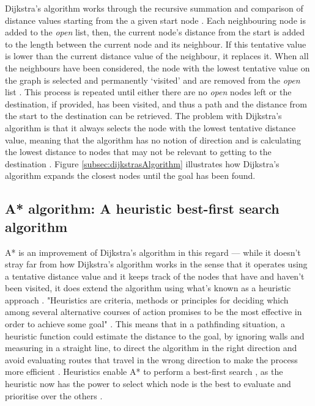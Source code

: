 \documentclass[11pt, a4paper]{report}
\begin{document}
Dijkstra's algorithm works through the recursive summation and comparison of distance values starting from the a given start node \parencite[269]{dijkstra1959note}. Each neighbouring node is added to the \emph{open} list, then, the current node's distance from the start is added to the length between the current node and its neighbour. If this tentative value is lower than the current distance value of the neighbour, it replaces it. When all the neighbours have been considered, the node with the lowest tentative value on the graph is selected and permanently `visited' and are removed from the \emph{open} list \parencite{dijkstra1959note}. This process is repeated until either there are no \emph{open} nodes left or the destination, if provided, has been visited, and thus a path and the distance from the start to the destination can be retrieved. The problem with Dijkstra's algorithm is that it always selects the node with the lowest tentative distance value, meaning that the algorithm has no notion of direction and is calculating the lowest distance to nodes that may not be relevant to getting to the destination \parencite[214]{millington2019ai}. Figure \ref{subsec:dijkstrasAlgorithm} illustrates how Dijkstra's algorithm expands the closest nodes until the goal has been found.

\subsection{A* algorithm: A heuristic best-first search algorithm}
\label{subsec:aStarAlgorithm}

A* is an improvement of Dijkstra's algorithm in this regard \parencite[101]{hart1968formal} --- while it doesn't stray far from how Dijkstra's algorithm works in the sense that it operates using a tentative distance value and it keeps track of the nodes that have and haven't been visited, it does extend the algorithm using what's known as a heuristic approach \parencite[126]{cui2011based}. "Heuristics are criteria, methods or principles for deciding which among several alternative courses of action promises to be the most effective in order to achieve some goal" \parencite[3]{pearl1984heuristics}. This means that in a pathfinding situation, a heuristic function could estimate the distance to the goal, by ignoring walls and measuring in a straight line, to direct the algorithm in the right direction and avoid evaluating routes that travel in the wrong direction to make the process more efficient \parencite[127]{cui2011based}. Heuristics enable A* to perform a best-first search \parencite[46]{yap2002grid}, as the heuristic now has the power to select which node is the best to evaluate and prioritise over the others \parencite[94]{russell2016artificial}.
\end{document}
